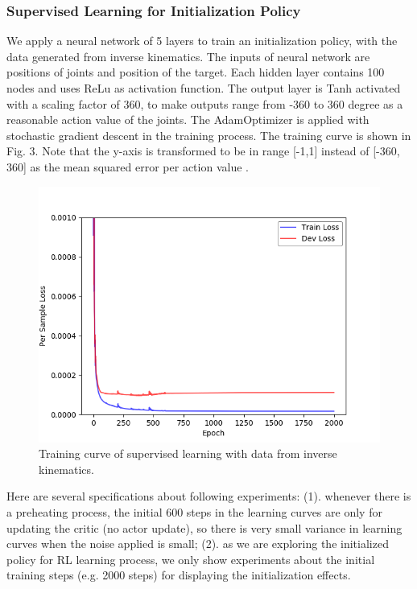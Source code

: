 \documentclass{article}
\begin{document}
\subsubsection{Supervised Learning for Initialization Policy}
We apply a neural network of 5 layers to train an initialization policy, with the data generated from inverse kinematics. The inputs of neural network are positions of joints and position of the target.  Each hidden layer contains 100 nodes and uses ReLu as activation function. The output layer is Tanh activated with a scaling factor of 360, to make outputs range from -360 to 360 degree as a reasonable action value of the joints. The AdamOptimizer is applied with stochastic gradient descent in the training process. The training curve is shown in Fig. 3. Note that the y-axis is transformed to be in range [-1,1] instead of [-360, 360] as the mean squared error per action value .
\begin{figure}[htbp]
	\centering
	\includegraphics[scale=0.8]{img/supervised.png}
	\caption{Training curve of supervised learning with data from inverse kinematics.}
	\label{fig:universe}
\end{figure}

Here are several specifications about following experiments: (1). whenever there is a preheating process, the initial 600 steps in the learning curves are only for updating the critic (no actor update), so there is very small variance in learning curves when the noise applied is small; (2). as we are exploring the initialized policy for RL learning process, we only show experiments about the initial training steps (e.g. 2000 steps) for displaying the initialization effects.
\end{document}
